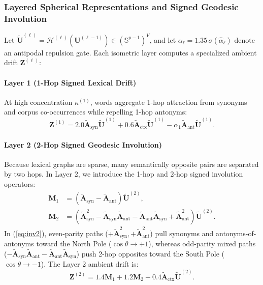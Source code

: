 \documentclass[journal]{IEEEtran}
\begin{document}
\subsubsection{Layered Spherical Representations and Signed Geodesic Involution}
Let $\tilde{\mathbf{U}}^{(\ell)} = \mathcal{H}^{(\ell)}(\mathbf{U}^{(\ell-1)}) \in (\mathbb{S}^{p-1})^V$, and let $\alpha_\ell = 1.35\,\sigma(\hat{\alpha}_\ell)$ denote an antipodal repulsion gate. Each isometric layer computes a specialized ambient drift $\mathbf{Z}^{(\ell)}$:

\paragraph{Layer 1 (1-Hop Signed Lexical Drift)}
At high concentration $\kappa^{(1)}$, words aggregate 1-hop attraction from synonyms and corpus co-occurrences while repelling 1-hop antonyms:
\begin{equation}
\mathbf{Z}^{(1)} = 2.0\tilde{\mathbf{A}}_{\text{syn}}\tilde{\mathbf{U}}^{(1)} + 0.6\tilde{\mathbf{A}}_{\text{ctx}}\tilde{\mathbf{U}}^{(1)} - \alpha_1\tilde{\mathbf{A}}_{\text{ant}}\tilde{\mathbf{U}}^{(1)}.
\label{eq:layer1_drift}
\end{equation}

\paragraph{Layer 2 (2-Hop Signed Geodesic Involution)}
Because lexical graphs are sparse, many semantically opposite pairs are separated by two hops. In Layer 2, we introduce the 1-hop and 2-hop signed involution operators:
\begin{align}
\mathbf{M}_1 &= \left(\tilde{\mathbf{A}}_{\text{syn}} - \tilde{\mathbf{A}}_{\text{ant}}\right)\tilde{\mathbf{U}}^{(2)}, \label{eq:inv1} \\
\mathbf{M}_2 &= \left(\tilde{\mathbf{A}}_{\text{syn}}^2 - \tilde{\mathbf{A}}_{\text{syn}}\tilde{\mathbf{A}}_{\text{ant}} - \tilde{\mathbf{A}}_{\text{ant}}\tilde{\mathbf{A}}_{\text{syn}} + \tilde{\mathbf{A}}_{\text{ant}}^2\right)\tilde{\mathbf{U}}^{(2)}. \label{eq:inv2}
\end{align}
In (\ref{eq:inv2}), even-parity paths ($+\tilde{\mathbf{A}}_{\text{syn}}^2, +\tilde{\mathbf{A}}_{\text{ant}}^2$) pull synonyms and antonyms-of-antonyms toward the North Pole ($\cos\theta \to +1$), whereas odd-parity mixed paths ($-\tilde{\mathbf{A}}_{\text{syn}}\tilde{\mathbf{A}}_{\text{ant}} - \tilde{\mathbf{A}}_{\text{ant}}\tilde{\mathbf{A}}_{\text{syn}}$) push 2-hop opposites toward the South Pole ($\cos\theta \to -1$). The Layer 2 ambient drift is:
\begin{equation}
\mathbf{Z}^{(2)} = 1.4\mathbf{M}_1 + 1.2\mathbf{M}_2 + 0.4\tilde{\mathbf{A}}_{\text{ctx}}\tilde{\mathbf{U}}^{(2)}.
\label{eq:layer2_drift}
\end{equation}
\end{document}
